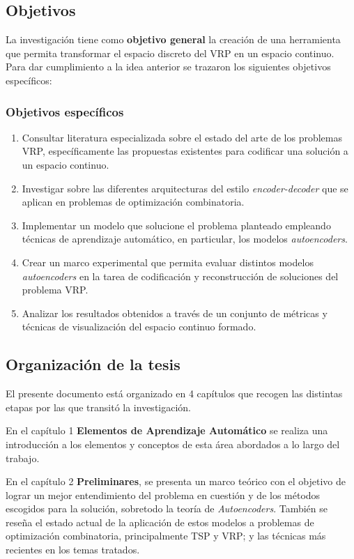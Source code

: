  
 

\subsection*{Objetivos}
La investigación tiene como \textbf{objetivo general} la creación de una herramienta que permita transformar el espacio discreto del VRP en un espacio continuo. Para dar cumplimiento a la idea anterior se trazaron los siguientes objetivos específicos:

\subsubsection*{Objetivos específicos}

\begin{enumerate}
	\item Consultar literatura especializada sobre el estado del arte de los problemas VRP, específicamente las propuestas existentes para codificar una solución a un espacio continuo.
	\item Investigar sobre las diferentes arquitecturas del estilo \textit{encoder-decoder} que se aplican en problemas de optimización combinatoria. 
	\item Implementar un modelo que solucione el problema planteado empleando técnicas de aprendizaje automático, en particular, los modelos \textit{autoencoders}.
	\item Crear un marco experimental que permita evaluar distintos modelos \textit{autoencoders} en la tarea de codificación y reconstrucción de soluciones del problema VRP.
	
	\item Analizar los resultados obtenidos a través de un conjunto de métricas y técnicas de visualización del espacio continuo formado.
\end{enumerate}


\subsection*{Organización de la tesis}

El presente documento está organizado en 4 capítulos que recogen las distintas etapas por las que transitó la investigación.


En el capítulo 1 \textbf{Elementos de Aprendizaje Automático} se realiza una introducción a los elementos y conceptos de esta área abordados a lo largo del trabajo.

En el capítulo 2 \textbf{Preliminares}, se presenta un marco teórico con el objetivo de lograr un mejor entendimiento del problema en cuestión y de los métodos escogidos para la solución, sobretodo la teoría de \textit{Autoencoders}. También se reseña el estado actual de la aplicación de estos modelos a problemas de optimización combinatoria, principalmente TSP y VRP; y las técnicas más recientes en los temas tratados. 

